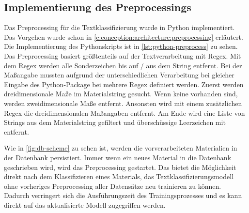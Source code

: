 \subsection{Implementierung des Preprocessings}
\label{c:implementation:preprocess}
Das Preprocessing für die Textklassifizierung wurde in Python implementiert.
Das Vorgehen wurde schon in \autoref{c:conception:architecture:preprocessing} erläutert. Die Implementierung des Pythonskripts ist in \autoref{lst:python-preprocess} zu sehen. Das Preprocessing basiert größtenteils auf der Textverarbeitung mit Regex. Mit dem Regex \code{[A-Za-z0-9üäöÜÄÖßóåéèÉÈÓ/]} werden alle Sonderzeichen bis auf  \glqq /\grqq{} aus dem String entfernt. Bei der Maßangabe mussten aufgrund der unterschiedlichen Verarbeitung bei gleicher Eingabe des Python-Package  bei   mehrere Regex definiert werden. Zuerst werden dreidimensionale Maße im Materialstring gesucht. Wenn keine vorhanden sind, werden zweidimensionale Maße entfernt. Ansonsten wird mit einem zusätzlichen Regex die dreidimensionalen Maßangaben entfernt. Am Ende wird eine Liste von Strings aus dem Materialstring gefiltert und überschüssige Leerzeichen mit  entfernt. 

Wie in \autoref{fig:db-scheme} zu sehen ist, werden die vorverarbeiteten Materialien in der Datenbank persistiert. Immer wenn ein neues Material in die Datenbank geschrieben wird, wird das Preprocessing gestartet. Das bietet die Möglichkeit direkt nach dem Klassifizieren eines Materials, das Textklassifizierungsmodell ohne vorheriges Preprocessing aller Datensätze neu trainieren zu können. Dadurch verringert sich die Ausführungszeit des Trainingsprozesses und es kann direkt auf das aktualisierte Modell zugegriffen werden.

